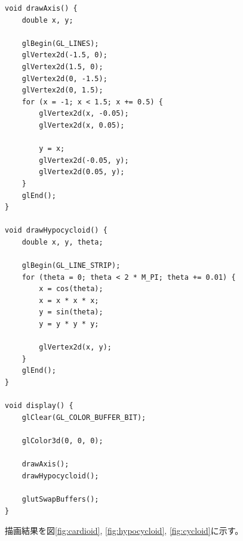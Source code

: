 \documentclass{jsarticle}
\begin{document}
        \begin{lstlisting}[caption=4尖点の内サイクロイドを描くプログラム, label=src:hypocycloid]
void drawAxis() {
    double x, y;

    glBegin(GL_LINES);
    glVertex2d(-1.5, 0);
    glVertex2d(1.5, 0);
    glVertex2d(0, -1.5);
    glVertex2d(0, 1.5);
    for (x = -1; x < 1.5; x += 0.5) {
        glVertex2d(x, -0.05);
        glVertex2d(x, 0.05);
        
        y = x;
        glVertex2d(-0.05, y);
        glVertex2d(0.05, y);
    }
    glEnd();
}

void drawHypocycloid() {
    double x, y, theta;

    glBegin(GL_LINE_STRIP);
    for (theta = 0; theta < 2 * M_PI; theta += 0.01) {
        x = cos(theta);
        x = x * x * x;
        y = sin(theta);
        y = y * y * y;

        glVertex2d(x, y);
    }
    glEnd();
}

void display() {
    glClear(GL_COLOR_BUFFER_BIT);

    glColor3d(0, 0, 0);

    drawAxis();
    drawHypocycloid();

    glutSwapBuffers();
}\end{lstlisting}

        描画結果を図\ref{fig:cardioid}, \ref{fig:hypocycloid}, \ref{fig:cycloid}に示す。
\end{document}
